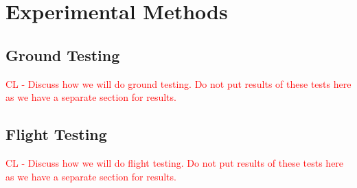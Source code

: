 \section{Experimental Methods}
\label{sec:ExperimentalMethods}

\subsection{Ground Testing}
\textcolor{red}{CL  - Discuss how we will do ground testing.  Do not put results of these tests here as we have a separate section for results.}


\subsection{Flight Testing}
\textcolor{red}{CL  - Discuss how we will do flight testing.  Do not put results of these tests here as we have a separate section for results.}

